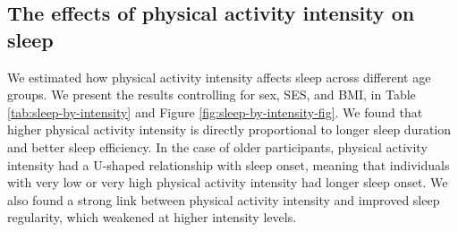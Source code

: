 \documentclass[
  man]{apa6}
\begin{document}
\hypertarget{the-effects-of-physical-activity-intensity-on-sleep}{%
\subsection{The effects of physical activity intensity on sleep}\label{the-effects-of-physical-activity-intensity-on-sleep}}

We estimated how physical activity intensity affects sleep across different age groups. We present the results controlling for sex, SES, and BMI, in Table \ref{tab:sleep-by-intensity} and Figure \ref{fig:sleep-by-intensity-fig}. We found that higher physical activity intensity is directly proportional to longer sleep duration and better sleep efficiency. In the case of older participants, physical activity intensity had a U-shaped relationship with sleep onset, meaning that individuals with very low or very high physical activity intensity had longer sleep onset. We also found a strong link between physical activity intensity and improved sleep regularity, which weakened at higher intensity levels.
\end{document}
